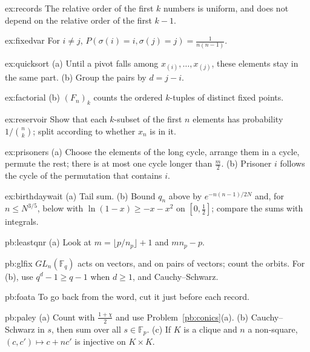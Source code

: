 \begin{hint}{ex:records}
The relative order of the first $k$ numbers is uniform, and does not depend on the relative order of the first
$k-1$.
\end{hint}
\begin{hint}{ex:fixedvar}
For $i\ne j$, $P(\sigma(i)=i,\sigma(j)=j)=\frac1{n(n-1)}$.
\end{hint}
\begin{hint}{ex:quicksort}
(a) Until a pivot falls among $x_{(i)},\dots,x_{(j)}$, these elements stay in the same part. (b) Group the pairs by $d=j-i$.
\end{hint}
\begin{hint}{ex:factorial}
(b) $(F_n)_k$ counts the ordered $k$-tuples of distinct fixed points.
\end{hint}
\begin{hint}{ex:reservoir}
Show that each $k$-subset of the first $n$ elements has probability $1/\binom nk$; split according to whether $x_{n}$ is in it.
\end{hint}
\begin{hint}{ex:prisoners}
(a) Choose the elements of the long cycle, arrange them in a cycle, permute the rest; there is at most one cycle
longer than $\frac m2$. (b) Prisoner $i$ follows the cycle of the permutation that contains $i$.
\end{hint}
\begin{hint}{ex:birthdaywait}
(a) Tail sum. (b) Bound $q_n$ above by $e^{-n(n-1)/2N}$ and, for $n\le N^{3/5}$, below with $\ln(1-x)\ge-x-x^2$ on
$[0,\frac12]$; compare the sums with integrals.
\end{hint}

\begin{hint}{pb:leastqnr}
(a) Look at $m=\lfloor p/n_p\rfloor+1$ and $mn_p-p$.
\end{hint}

\begin{hint}{pb:glfix}
$GL_n(\mathbb F_q)$ acts on vectors, and on pairs of vectors; count the orbits. For (b), use $q^d-1\ge q-1$ when $d\ge1$,
and Cauchy--Schwarz.
\end{hint}

\begin{hint}{pb:foata}
To go back from the word, cut it just before each record.
\end{hint}

\begin{hint}{pb:paley}
(a) Count with $\frac{1+\chi}2$ and use Problem~\ref{pb:conics}(a). (b) Cauchy--Schwarz in $s$, then sum over all $s\in\mathbb F_p$.
(c) If $K$ is a clique and $n$ a non-square, $(c,c')\mapsto c+nc'$ is injective on $K\times K$.
\end{hint}

